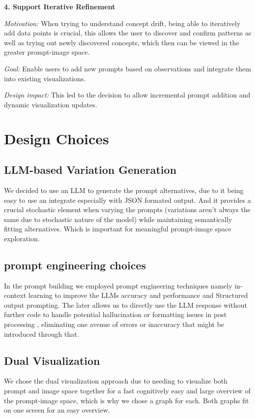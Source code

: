 \documentclass[
  a4paper,  %
  twoside,  %
  bibliography=totoc,
  headsepline,
  cleardoublepage=empty,
  parskip=half,
  draft=false
]{scrbook}
\begin{document}
\textbf{4. Support Iterative Refinement}

\textit{Motivation:} When trying to understand concept drift, being able to iteratively add data points is crucial, this allows the user to discover and confirm patterns as well as trying out newly discovered concepts, which then can be viewed in the greater prompt-image space.

\textit{Goal:} Enable users to add new prompts based on observations and integrate them into existing visualizations.

\textit{Design impact:} This led to the decision to allow incremental prompt addition and dynamic visualization updates.

\section{Design Choices}
\label{sec:design}
 \subsection{LLM-based Variation Generation} 
 We decided to use an LLM to generate the prompt alternatives, due to it being easy to use an integrate especially with JSON formated output. And it provides a crucial stochastic element when varying the prompts (variations aren't always the same due to stochastic nature of the model) while maintaining semantically fitting alternatives. Which is important for meaningful prompt-image space exploration.
\subsection{prompt engineering choices}
  In the prompt building we employed prompt engineering techniques namely in-context learning to improve the LLMs accuracy and performance and Structured output prompting. The later allows us to directly use the LLM response without further code to handle potential hallucination or formatting issues in post processing \cite{LLMoutputconstraints}, eliminating one avenue of errors or inaccuracy that might be introduced through that. 
\subsection{Dual Visualization}
We chose the dual visualization approach due to needing to visualize both prompt and image space together for a fast cognitively easy and large overview of the prompt-image space, which is why we chose a graph for each. Both graphs fit on one screen for an easy overview. 
\end{document}
